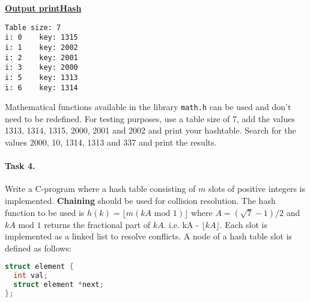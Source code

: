 \documentclass[a4paper]{article}
\begin{document}
\begin{itemize}
\begin{center}
\begin{minipage}[t]{0.2\textwidth}
\end{minipage}
\hspace{1.5cm}
\begin{minipage}[t]{0.5\textwidth}
\underline{\textbf{Output printHash}}		
\begin{verbatim}
Table size: 7
i: 0    key: 1315
i: 1    key: 2002
i: 2    key: 2001
i: 3    key: 2000
i: 5    key: 1313
i: 6    key: 1314
\end{verbatim}
\end{minipage}
\end{center}

\end{itemize}

Mathematical functions available in the library \lstinline!math.h! can be used
and don't need to be redefined. For testing purposes, use a table size
of 7, add the values 1313, 1314, 1315, 2000, 2001 and 2002 and print your
hashtable. Search for the values 2000, 10, 1314, 1313 and 337 and print the results.

\paragraph{Task 4.}

Write a C-program where a hash table consisting of $m$ slots of positive integers is implemented.
\textbf{Chaining} should be used for collision resolution.
 The hash function to be used is
$h(k) = \lfloor m (kA \mbox{ mod }1) \rfloor$ where
$A=(\sqrt{7}-1)/2$ and $kA \mbox{ mod } 1$ returns the
fractional part of $kA$. i.e. kA - $\lfloor kA \rfloor$. Each slot is implemented as a linked
list to resolve conflicts. A
node of a hash table slot is defined as follows:

\begin{center}
  \begin{minipage}[t]{0.425\textwidth}
    \begin{lstlisting}[language=C]
struct element {
  int val;
  struct element *next;
};
\end{lstlisting}
  \end{minipage}
\end{center}
\end{document}
